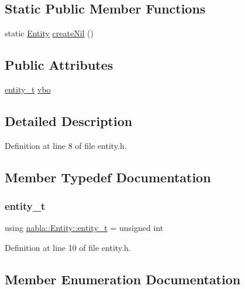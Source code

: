 \subsection*{Static Public Member Functions}
\begin{DoxyCompactItemize}
\item 
static \mbox{\hyperlink{structnabla_1_1_entity}{Entity}} \mbox{\hyperlink{structnabla_1_1_entity_a35c224e7c7c7f35e71150cdc3184b356}{create\+Nil}} ()
\end{DoxyCompactItemize}
\subsection*{Public Attributes}
\begin{DoxyCompactItemize}
\item 
\mbox{\hyperlink{structnabla_1_1_entity_a0e7d5826cda759dfeb3a81c8175f3b4d}{entity\+\_\+t}} \mbox{\hyperlink{structnabla_1_1_entity_ab7db36f74338d506d40f7f17e3308b29}{vbo}}
\end{DoxyCompactItemize}


\subsection{Detailed Description}


Definition at line 8 of file entity.\+h.



\subsection{Member Typedef Documentation}
\mbox{\label{structnabla_1_1_entity_a0e7d5826cda759dfeb3a81c8175f3b4d}} 
\subsubsection{\texorpdfstring{entity\_t}{entity\_t}}
{\footnotesize\ttfamily using \mbox{\hyperlink{structnabla_1_1_entity_a0e7d5826cda759dfeb3a81c8175f3b4d}{nabla\+::\+Entity\+::entity\+\_\+t}} =  unsigned int}



Definition at line 10 of file entity.\+h.



\subsection{Member Enumeration Documentation}
\mbox{\label{structnabla_1_1_entity_af5d356291772b453f7788f76d3b6eda3}} 
